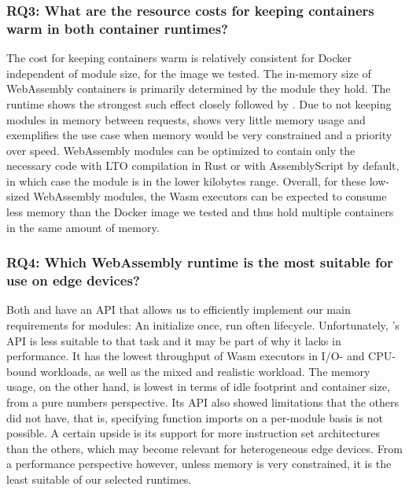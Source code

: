 \subsubsection*{RQ3: What are the resource costs for keeping containers warm in both container runtimes?}

The cost for keeping containers warm is relatively consistent for Docker independent of module size, for the image we tested. The in-memory size of WebAssembly containers is primarily determined by the module they hold. The  runtime shows the strongest such effect closely followed by . Due to not keeping modules in memory between requests,  shows very little memory usage and exemplifies the use case when memory would be very constrained and a priority over speed. WebAssembly modules can be optimized to contain only the necessary code with LTO compilation in Rust or with AssemblyScript by default, in which case the module is in the lower kilobytes range.
Overall, for these low-sized WebAssembly modules, the Wasm executors can be expected to consume less memory than the Docker image we tested and thus hold multiple containers in the same amount of memory.

\subsubsection*{RQ4: Which WebAssembly runtime is the most suitable for use on edge devices?}

Both  and  have an API that allows us to efficiently implement our main requirements for modules: An initialize once, run often lifecycle. Unfortunately, 's API is less suitable to that task and it may be part of why it lacks in performance. It has the lowest throughput of Wasm executors in I/O- and CPU-bound workloads, as well as the mixed and realistic workload. The memory usage, on the other hand, is lowest in terms of idle footprint and container size, from a pure numbers perspective. Its API also showed limitations that the others did not have, that is, specifying function imports on a per-module basis is not possible. A certain upside is its support for more instruction set architectures than the others, which may become relevant for heterogeneous edge devices. From a performance perspective however, unless memory is very constrained, it is the least suitable of our selected runtimes.

